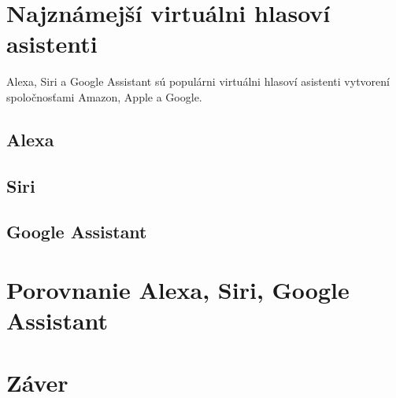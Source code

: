 \documentclass[10pt,twoside,slovak,coursepaper]{article}
\begin{document}
\section{Najznámejší virtuálni hlasoví asistenti}
Alexa, Siri a Google Assistant sú populárni virtuálni hlasoví asistenti vytvorení spoločnosťami Amazon, Apple a Google. 
\subsection{Alexa}
\subsection{Siri}
\subsection{Google Assistant}
\section{Porovnanie Alexa, Siri, Google Assistant}
\section{Záver}


%
%
\end{document}

